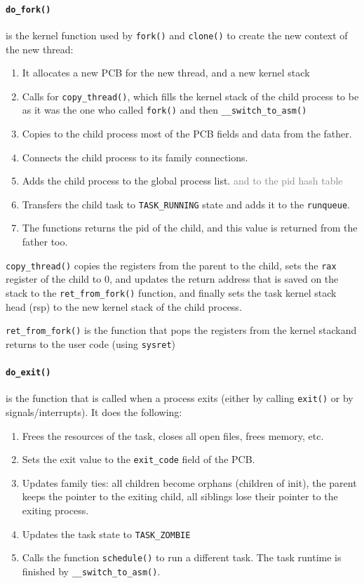 \documentclass[openany,12pt]{book}
\newcommand{\code}[1]{\texttt{#1}}
\newcommand{\gray}[1]{\textcolor{gray}{#1}}
\begin{document}
\paragraph{\code{do\_fork()}} is the kernel function used by \code{fork()} and \code{clone()} to create the new context of the new thread:
\begin{enumerate}
  \item It allocates a new PCB for the new thread, and a new kernel stack
  \item Calls for \code{copy\_thread()}, which fills the kernel stack of the child process to be as it was the one who called \code{fork()} and then \code{\_\_switch\_to\_asm()}
  \item Copies to the child process most of the PCB fields and data from the father.
  \item Connects the child process to its family connections.
  \item Adds the child process to the global process list. \gray{and to the pid hash table}
  \item Transfers the child task to \code{TASK\_RUNNING} state and adds it to the \code{runqueue}.
  \item The functions returns the pid of the child, and this value is returned from the father too.
\end{enumerate}

\code{copy\_thread()} copies the registers from the parent to the child, sets the \code{rax} register of the child to 0, and updates the return address that is saved on the stack to the \code{ret\_from\_fork()} function, and finally sets the task kernel stack head (rsp) to the new kernel stack of the child process.

\code{ret\_from\_fork()} is the function that pops the registers from the kernel stackand returns to the user code (using \code{sysret})


\paragraph{\code{do\_exit()}} is the function that is called when a process exits (either by calling \code{exit()} or by signals/interrupts). It does the following:
\begin{enumerate}
  \item Frees the resources of the task, closes all open files, frees memory, etc.
  \item Sets the exit value to the \code{exit\_code} field of the PCB.
  \item Updates family ties: all children become orphans (children of init), the parent keeps the pointer to the exiting child, all siblings lose their pointer to the exiting process.
  \item Updates the task state to \code{TASK\_ZOMBIE}
  \item Calls the function \code{schedule()} to run a different task. The task runtime is finished by \code{\_\_switch\_to\_asm()}.
\end{enumerate}
\end{document}
